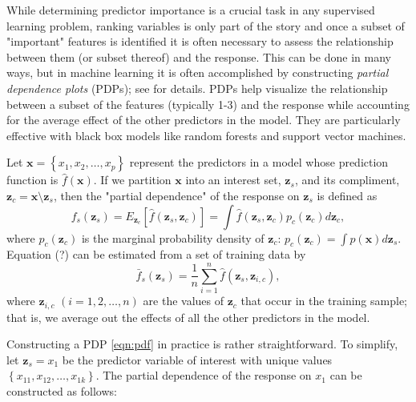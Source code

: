 \documentclass[12pt]{article}
\begin{document}
While determining predictor importance is a crucial task in any supervised learning problem, ranking variables is only part of the story and once a subset of "important" features is identified it is often necessary to assess the relationship between them (or subset thereof) and the response. This can be done in many ways, but in machine learning it is often accomplished by constructing \textit{partial dependence plots} (PDPs); see \citet{friedman-2001-greedy} for details. PDPs help visualize the relationship between a subset of the features (typically 1-3) and the response while accounting for the average effect of the other predictors in the model. They are particularly effective with black box models like random forests and support vector machines.

Let $\boldsymbol{x} = \left\{x_1, x_2, \dots, x_p\right\}$ represent the predictors in a model whose prediction function is $\widehat{f}\left(\boldsymbol{x}\right)$. If we partition $\boldsymbol{x}$ into an interest set, $\boldsymbol{z}_s$, and its compliment, $\boldsymbol{z}_c = \boldsymbol{x} \setminus \boldsymbol{z}_s$, then the "partial dependence" of the response on $\boldsymbol{z}_s$ is defined as
\begin{equation}
\label{eqn:avg_fun}
  f_s\left(\boldsymbol{z}_s\right) = E_{\boldsymbol{z}_c}\left[\widehat{f}\left(\boldsymbol{z}_s, \boldsymbol{z}_c\right)\right] = \int \widehat{f}\left(\boldsymbol{z}_s, \boldsymbol{z}_c\right)p_{c}\left(\boldsymbol{z}_c\right)d\boldsymbol{z}_c,
\end{equation}
where $p_{c}\left(\boldsymbol{z}_c\right)$ is the marginal probability density of $\boldsymbol{z}_c$: $p_{c}\left(\boldsymbol{z}_c\right) = \int p\left(\boldsymbol{x}\right)d\boldsymbol{z}_s$.
Equation (?) can be estimated from a set of training data by
\begin{equation}
\label{eqn:pdf}
\bar{f}_s\left(\boldsymbol{z}_s\right) = \frac{1}{n}\sum_{i = 1}^n\widehat{f}\left(\boldsymbol{z}_s,\boldsymbol{z}_{i, c}\right),
\end{equation}
where $\boldsymbol{z}_{i, c}$ $\left(i = 1, 2, \dots, n\right)$ are the values of $\boldsymbol{z}_c$ that occur in the training sample; that is, we average out the effects of all the other predictors in the model.

Constructing a PDP \eqref{eqn:pdf} in practice is rather straightforward. To simplify, let $\boldsymbol{z}_s = x_1$ be the predictor variable of interest with unique values $\left\{x_{11}, x_{12}, \dots, x_{1k}\right\}$. The partial dependence of the response on $x_1$ can be constructed as follows:
\end{document}
